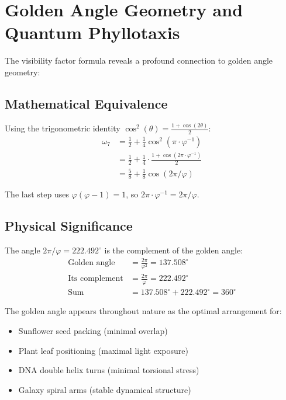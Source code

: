 \documentclass[%
 reprint,
 amsmath,amssymb,
 aps,
 prd,
 10pt,
 nofootinbib,      %
 longbibliography  %
]{revtex4-2}
\theoremstyle{definition}
\theoremstyle{remark}
\begin{document}
\section{Golden Angle Geometry and Quantum Phyllotaxis}\label{sec:golden}

The visibility factor formula reveals a profound connection to golden angle geometry:

\subsection{Mathematical Equivalence}

Using the trigonometric identity $\cos^2(\theta) = \frac{1 + \cos(2\theta)}{2}$:
\begin{align}
\omega_7 &= \frac{1}{2} + \frac{1}{4}\cos^2(\pi \cdot \varphi^{-1}) \\
&= \frac{1}{2} + \frac{1}{4} \cdot \frac{1 + \cos(2\pi \cdot \varphi^{-1})}{2} \\
&= \frac{5}{8} + \frac{1}{8}\cos(2\pi/\varphi)
\end{align}

The last step uses $\varphi(\varphi - 1) = 1$, so $2\pi \cdot \varphi^{-1} = 2\pi/\varphi$.

\subsection{Physical Significance}

The angle $2\pi/\varphi = 222.492^\circ$ is the complement of the golden angle:
\begin{align}
\text{Golden angle} &= \frac{2\pi}{\varphi^2} = 137.508^\circ \\
\text{Its complement} &= \frac{2\pi}{\varphi} = 222.492^\circ \\
\text{Sum} &= 137.508^\circ + 222.492^\circ = 360^\circ
\end{align}

The golden angle appears throughout nature as the optimal arrangement for:
\begin{itemize}
\item Sunflower seed packing (minimal overlap)
\item Plant leaf positioning (maximal light exposure)
\item DNA double helix turns (minimal torsional stress)
\item Galaxy spiral arms (stable dynamical structure)
\end{itemize}
\end{document}
